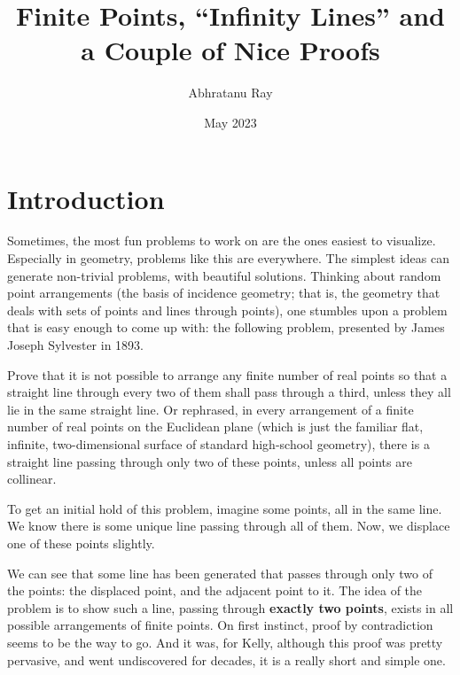 \documentclass{article}
\title{Finite Points, \enquote{Infinity Lines} and a Couple of Nice Proofs}
\author{Abhratanu Ray}
\date{May 2023}
\begin{document}
\maketitle

\section{Introduction}
Sometimes, the most fun problems to work on are the ones easiest to visualize. Especially in geometry, problems like this are everywhere. The simplest ideas can generate non-trivial problems, with beautiful solutions.\newline
Thinking about random point arrangements (the basis of incidence geometry; that is, the geometry that deals with sets of points and lines through points), one stumbles upon a problem that is easy enough to come up with: the following problem, presented by James Joseph Sylvester in 1893.
\begin{remark*}
    Prove that it is not possible to arrange any finite number of real points so that a straight line through every two of them shall pass through a third, unless they all lie in the same straight line.\newline
    \text{}\newline
    Or rephrased, in every arrangement of a finite number of real points on the Euclidean plane (which is just the familiar flat, infinite, two-dimensional surface of standard high-school geometry), there is a straight line passing through only two of these points, unless all points are collinear.
\end{remark*}

\noindent To get an initial hold of this problem, imagine some points, all in the same line. We know there is some unique line passing through all of them. Now, we displace one of these points slightly.\newline

We can see that some line has been generated that passes through only two of the points: the displaced point, and the adjacent point to it. The idea of the problem is to show such a line, passing through \textbf{exactly two points}, exists in all possible arrangements of finite points.\newline
On first instinct, proof by contradiction seems to be the way to go. And it was, for Kelly, although this proof was pretty pervasive, and went undiscovered for decades, it is a really short and simple one.\newline
\end{document}
